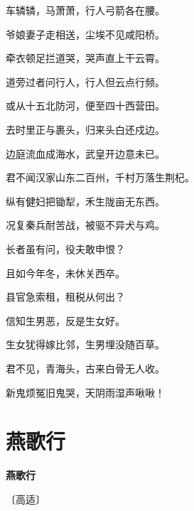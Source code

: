 \documentclass[12pt,UTF-8,openany,fontset=none]{ctexbook}
\begin{document}
\begin{center}
    \begin{Large}

        车辚辚，马萧萧，行人弓箭各在腰。

        爷娘妻子走相送，尘埃不见咸阳桥。

        牵衣顿足拦道哭，哭声直上干云霄。

        道旁过者问行人，行人但云点行频。

        或从十五北防河，便至四十西营田。

        去时里正与裹头，归来头白还戍边。

        边庭流血成海水，武皇开边意未已。

        君不闻汉家山东二百州，千村万落生荆杞。\hspace{40pt}

        纵有健妇把锄犁，禾生陇亩无东西。

        况复秦兵耐苦战，被驱不异犬与鸡。

        长者虽有问，役夫敢申恨？

        且如今年冬，未休关西卒。

        县官急索租，租税从何出？

        信知生男恶，反是生女好。

        生女犹得嫁比邻，生男埋没随百草。

        君不见，青海头，古来白骨无人收。

        新鬼烦冤旧鬼哭，天阴雨湿声啾啾！

    \end{Large}

\end{center}

\vspace{8pt}
\clearpage

\section{燕歌行}


\begin{center}
    {\bfseries 燕歌行}

    \vspace{18pt}

    \begin{large}\xuwen
        〔高适〕
    \end{large}

\end{center}
\end{document}
